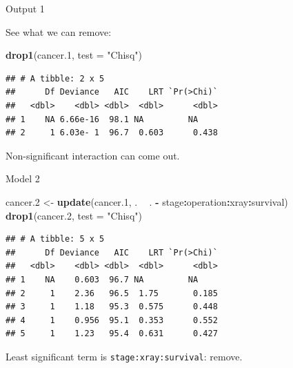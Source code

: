 \documentclass[
  ignorenonframetext,
]{beamer}
\newenvironment{Shaded}{\begin{snugshade}}{\end{snugshade}}
\newcommand{\DataTypeTok}[1]{\textcolor[rgb]{0.13,0.29,0.53}{#1}}
\newcommand{\FloatTok}[1]{\textcolor[rgb]{0.00,0.00,0.81}{#1}}
\newcommand{\KeywordTok}[1]{\textcolor[rgb]{0.13,0.29,0.53}{\textbf{#1}}}
\newcommand{\NormalTok}[1]{#1}
\newcommand{\OperatorTok}[1]{\textcolor[rgb]{0.81,0.36,0.00}{\textbf{#1}}}
\newcommand{\StringTok}[1]{\textcolor[rgb]{0.31,0.60,0.02}{#1}}
\begin{document}
\begin{frame}[fragile]{Output 1}
\protect\hypertarget{output-1-1}{}

See what we can remove:

\scriptsize

\begin{Shaded}
\begin{Highlighting}[]
\KeywordTok{drop1}\NormalTok{(cancer}\FloatTok{.1}\NormalTok{, }\DataTypeTok{test =} \StringTok{"Chisq"}\NormalTok{)}
\end{Highlighting}
\end{Shaded}

\begin{verbatim}
## # A tibble: 2 x 5
##      Df Deviance   AIC    LRT `Pr(>Chi)`
##   <dbl>    <dbl> <dbl>  <dbl>      <dbl>
## 1    NA 6.66e-16  98.1 NA         NA    
## 2     1 6.03e- 1  96.7  0.603      0.438
\end{verbatim}

\normalsize

Non-significant interaction can come out.

\end{frame}

\begin{frame}[fragile]{Model 2}
\protect\hypertarget{model-2-1}{}

\scriptsize

\begin{Shaded}
\begin{Highlighting}[]
\NormalTok{cancer}\FloatTok{.2}\NormalTok{ <-}\StringTok{ }\KeywordTok{update}\NormalTok{(cancer}\FloatTok{.1}\NormalTok{, . }\OperatorTok{~}\StringTok{ }\NormalTok{. }\OperatorTok{-}\StringTok{ }\NormalTok{stage}\OperatorTok{:}\NormalTok{operation}\OperatorTok{:}\NormalTok{xray}\OperatorTok{:}\NormalTok{survival)}
\KeywordTok{drop1}\NormalTok{(cancer}\FloatTok{.2}\NormalTok{, }\DataTypeTok{test =} \StringTok{"Chisq"}\NormalTok{)}
\end{Highlighting}
\end{Shaded}

\begin{verbatim}
## # A tibble: 5 x 5
##      Df Deviance   AIC    LRT `Pr(>Chi)`
##   <dbl>    <dbl> <dbl>  <dbl>      <dbl>
## 1    NA    0.603  96.7 NA         NA    
## 2     1    2.36   96.5  1.75       0.185
## 3     1    1.18   95.3  0.575      0.448
## 4     1    0.956  95.1  0.353      0.552
## 5     1    1.23   95.4  0.631      0.427
\end{verbatim}

\normalsize

Least significant term is \texttt{stage:xray:survival}: remove.

\end{frame}
\end{document}
